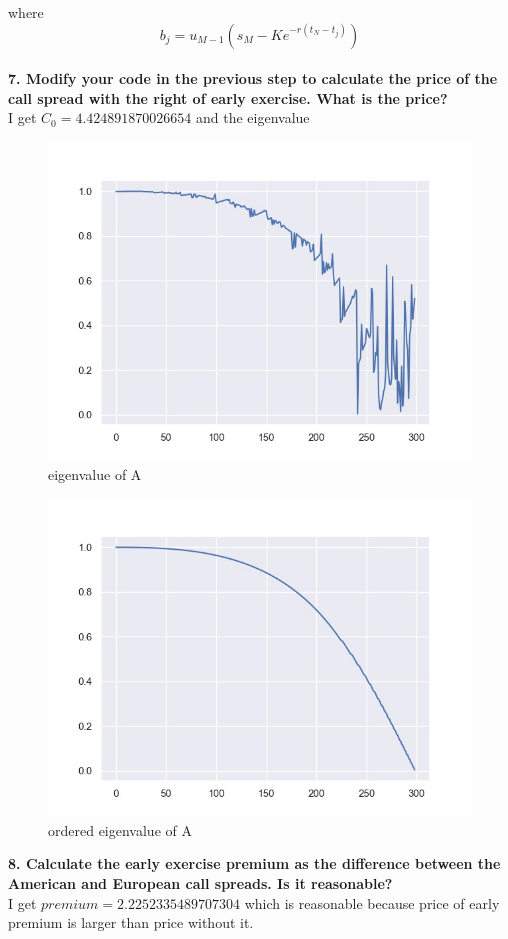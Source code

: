 \documentclass{winnower}
\begin{document}
where
$$b_{j}=u_{M-1}\left(s_{M}-K e^{-r\left(t_{N}-t_{j}\right)}\right)$$
\\

\textbf{7. Modify your code in the previous step to calculate the price of the call spread with the right of early exercise. What is the price?}
\\

I get $C_0=4.424891870026654$ and the eigenvalue

\begin{figure}[!h]
\begin{center}
\includegraphics[scale=0.7]{1_3.jpg}
\caption
{eigenvalue of A}
\label{fig:f1}
\end{center}
\end{figure}

\begin{figure}[!h]
\begin{center}
\includegraphics[scale=0.7]{1_4.jpg}
\caption
{ordered eigenvalue of A}
\label{fig:f1}
\end{center}
\end{figure}


\newpage
\textbf{8. Calculate the early exercise premium as the difference between the American and European call spreads. Is it reasonable?}
\\

I get $premium=2.2252335489707304$ which is reasonable because price of early premium is larger than price without it.
\end{document}
